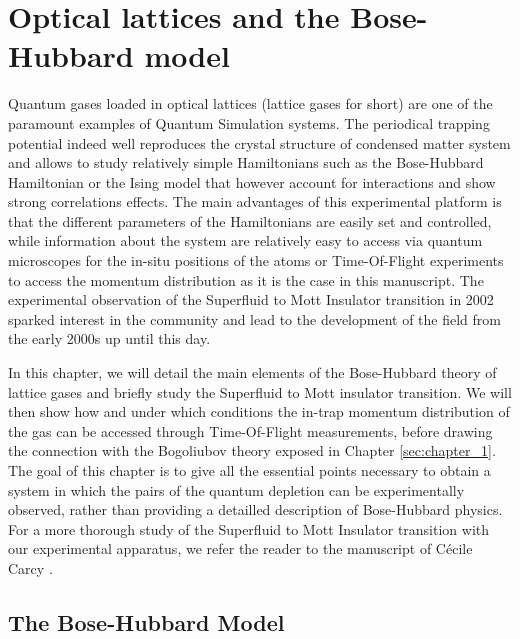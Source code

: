 
\chapter{Optical lattices and the Bose-Hubbard model}

\label{sec:chapter_2}

Quantum gases loaded in optical lattices (lattice gases for short) are one of the paramount examples of Quantum Simulation systems. The periodical trapping potential indeed well reproduces the crystal structure of condensed matter system and allows to study relatively simple Hamiltonians such as the Bose-Hubbard Hamiltonian or the Ising model \cite{bloch2005ultracold} that however account for interactions and show strong correlations effects. The main advantages of this experimental platform is that the different parameters of the Hamiltonians are easily set and controlled, while information about the system are relatively easy to access via quantum microscopes \cite{bakr2009quantum} for the in-situ positions of the atoms or Time-Of-Flight experiments to access the momentum distribution as it is the case in this manuscript. The experimental observation of the Superfluid to Mott Insulator transition in 2002 \cite{greiner2002quantum} sparked interest in the community and lead to the development of the field from the early 2000s up until this day.

In this chapter, we will detail the main elements of the Bose-Hubbard theory of lattice gases and briefly study the Superfluid to Mott insulator transition. We will then show how and under which conditions the in-trap momentum distribution of the gas can be accessed through Time-Of-Flight measurements, before drawing the connection with the Bogoliubov theory exposed in Chapter \ref{sec:chapter_1}. The goal of this chapter is to give all the essential points necessary to obtain a system in which the \kmk pairs of the quantum depletion can be experimentally observed, rather than providing a detailled description of Bose-Hubbard physics. For a more thorough study of the Superfluid to Mott Insulator transition with our experimental apparatus, we refer the reader to the manuscript of Cécile Carcy \cite{carcy_these}.




\section{The Bose-Hubbard Model}

